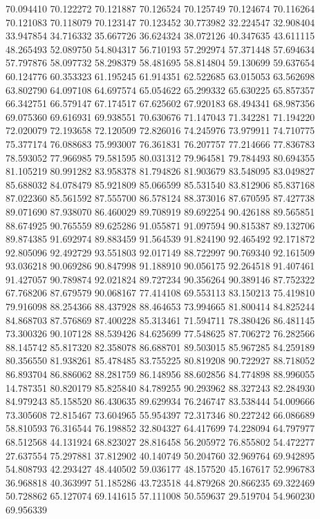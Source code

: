 70.094410
70.122272
70.121887
70.126524
70.125749
70.124674
70.116264
70.121083
70.118079
70.123147
70.123452
30.773982
32.224547
32.908404
33.947854
34.716332
35.667726
36.624324
38.072126
40.347635
43.611115
48.265493
52.089750
54.804317
56.710193
57.292974
57.371448
57.694634
57.797876
58.097732
58.298379
58.481695
58.814804
59.130699
59.637654
60.124776
60.353323
61.195245
61.914351
62.522685
63.015053
63.562698
63.802790
64.097108
64.697574
65.054622
65.299332
65.630225
65.857357
66.342751
66.579147
67.174517
67.625602
67.920183
68.494341
68.987356
69.075360
69.616931
69.938551
70.630676
71.147043
71.342281
71.194220
72.020079
72.193658
72.120509
72.826016
74.245976
73.979911
74.710775
75.377174
76.088683
75.993007
76.361831
76.207757
77.214666
77.836783
78.593052
77.966985
79.581595
80.031312
79.964581
79.784493
80.694355
81.105219
80.991282
83.958378
81.794826
81.903679
83.548095
83.049827
85.688032
84.078479
85.921809
85.066599
85.531540
83.812906
85.837168
87.022360
85.561592
87.555700
86.578124
88.373016
87.670595
87.427738
89.071690
87.938070
86.460029
89.708919
89.692254
90.426188
89.565851
88.674925
90.765559
89.625286
91.055871
91.097594
90.815387
89.132706
89.874385
91.692974
89.883459
91.564539
91.824190
92.465492
92.171872
92.805096
92.492729
93.551803
92.017149
88.722997
90.769340
92.161509
93.036218
90.069286
90.847998
91.188910
90.056175
92.264518
91.407461
91.427057
90.789874
92.021824
89.727234
90.356264
90.389146
87.752322
67.768206
87.679579
90.068167
77.414108
69.553113
83.150213
75.419810
79.916098
88.254366
88.437928
88.464653
73.994665
81.800414
84.825244
84.868703
87.576869
87.400228
85.313461
71.594711
78.380426
86.481145
73.300326
90.107128
88.539426
84.625699
77.548625
87.706272
76.282566
88.145742
85.817320
82.358078
86.688701
89.503015
85.967285
84.259189
80.356550
81.938261
85.478485
83.755225
80.819208
90.722927
88.718052
86.893704
86.886062
88.281759
86.148956
88.602856
84.774898
88.996055
14.787351
80.820179
85.825840
84.789255
90.293962
88.327243
82.284930
84.979243
85.158520
86.430635
89.629934
76.246747
83.538444
54.009666
73.305608
72.815467
73.604965
55.954397
72.317346
80.227242
66.086689
58.810593
76.316544
76.198852
32.804327
64.417699
74.228094
64.797977
68.512568
44.131924
68.823027
28.816458
56.205972
76.855802
54.472277
27.637554
75.297881
37.812902
40.140749
50.204760
32.969764
69.942895
54.808793
42.293427
48.440502
59.036177
48.157520
45.167617
52.996783
36.968818
40.363997
51.185286
43.723518
44.879268
20.866235
69.322469
50.728862
65.127074
69.141615
57.111008
50.559637
29.519704
54.960230
69.956339
